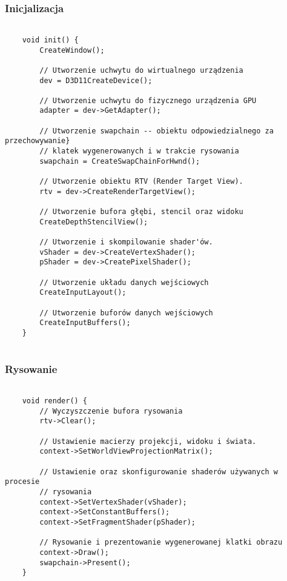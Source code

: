 \subsubsection{Inicjalizacja}
\begin{lstlisting}[caption={Pseudokod inicjalizacji Direct3D 11 (oryginalna treść)}, label={lst:d3d11_init}]
	
	void init() {
		CreateWindow();
		
		// Utworzenie uchwytu do wirtualnego urządzenia
		dev = D3D11CreateDevice();
		
		// Utworzenie uchwytu do fizycznego urządzenia GPU
		adapter = dev->GetAdapter();
		
		// Utworzenie swapchain -- obiektu odpowiedzialnego za przechowywanie}
		// klatek wygenerowanych i w trakcie rysowania
		swapchain = CreateSwapChainForHwnd();
		
		// Utworzenie obiektu RTV (Render Target View).
		rtv = dev->CreateRenderTargetView();
		
		// Utworzenie bufora głębi, stencil oraz widoku
		CreateDepthStencilView();
		
		// Utworzenie i skompilowanie shader'ów.
		vShader = dev->CreateVertexShader();
		pShader = dev->CreatePixelShader();
		
		// Utworzenie układu danych wejściowych
		CreateInputLayout();
		
		// Utworzenie buforów danych wejściowych
		CreateInputBuffers();
	}
	
\end{lstlisting}

\subsubsection{Rysowanie}
\begin{lstlisting}[caption={Pseudokod rysowania Direct3D 11 (oryginalna treść)}, label={lst:d3d11_render}]
	
	void render() {
		// Wyczyszczenie bufora rysowania
		rtv->Clear();
		
		// Ustawienie macierzy projekcji, widoku i świata.
		context->SetWorldViewProjectionMatrix();
		
		// Ustawienie oraz skonfigurowanie shaderów używanych w procesie
		// rysowania
		context->SetVertexShader(vShader);	
		context->SetConstantBuffers();
		context->SetFragmentShader(pShader);
		
		// Rysowanie i prezentowanie wygenerowanej klatki obrazu
		context->Draw();
		swapchain->Present();
	}
	
\end{lstlisting}

